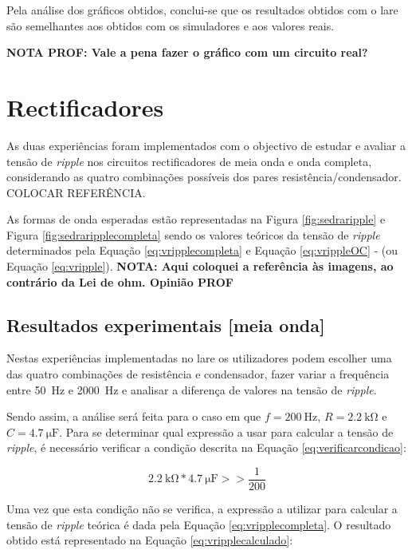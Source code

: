 Pela análise dos gráficos obtidos, conclui-se que os resultados obtidos com o \acrshort{lare} são semelhantes aos obtidos com os simuladores e aos valores reais.

\textbf{NOTA PROF: Vale a pena fazer o gráfico com um circuito real?}

\section{Rectificadores}
\label{sec:resultados_rectificadores}
As duas experiências foram implementados com o objectivo de estudar e avaliar a tensão de \textit{ripple} nos circuitos rectificadores de meia onda e onda completa, considerando as quatro combinações possíveis dos pares resistência/condensador. COLOCAR REFERÊNCIA.

As formas de onda esperadas estão representadas na Figura \ref{fig:sedraripple} e Figura \ref{fig:sedraripplecompleta} sendo os valores teóricos da tensão de \textit{ripple} determinados pela Equação \ref{eq:vripplecompleta} e Equação \ref{eq:vrippleOC} - (ou Equação \ref{eq:vripple}). \textbf{NOTA: Aqui coloquei a referência às imagens, ao contrário da Lei de ohm. Opinião PROF}
\subsection{Resultados experimentais [meia onda]}
\label{sec:resultados_RectificadoresMeiaOnda}
Nestas experiências implementadas no \acrshort{lare} os utilizadores podem escolher uma das quatro combinações de resistência e condensador, fazer variar a frequência entre \SI{50}{\hertz} e \SI{2000}{\hertz} e analisar a diferença de valores na tensão de \textit{ripple}.

Sendo assim, a análise será feita para o caso em que $f=\SI{200}{\hertz}$, $R=\SI{2.2}{\kilo\ohm}$ e $C=\SI{4.7}{\micro\farad}$. Para se determinar qual expressão a usar para calcular a tensão de \textit{ripple}, é necessário verificar a condição descrita na Equação \ref{eq:verificarcondicao}:

\begin{equation} \label{eq:verificarcondicao}
	\SI{2.2}{\kilo\ohm} * \SI{4.7}{\micro\farad} >> \dfrac{1}{200}
\end{equation}

Uma vez que esta condição não se verifica, a expressão a utilizar para calcular a tensão de \textit{ripple} teórica é dada pela Equação \ref{eq:vripplecompleta}. O resultado obtido está representado na Equação \ref{eq:vripplecalculado}:

